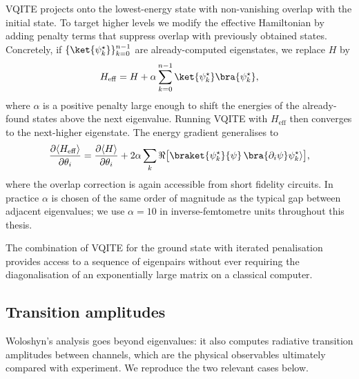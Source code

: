 VQITE projects onto the lowest-energy state with non-vanishing overlap
with the initial state. To target higher levels we modify the effective
Hamiltonian by adding penalty terms that suppress overlap with previously
obtained states. Concretely, if $\{\ket{\psi_k^{\star}}\}_{k=0}^{n-1}$
are already-computed eigenstates, we replace $H$ by
\begin{equation}
  \label{eq:penalised_H}
  H_{\mathrm{eff}}
  = H + \alpha\sum_{k=0}^{n-1} \ket{\psi_k^{\star}}\bra{\psi_k^{\star}},
\end{equation}
where $\alpha$ is a positive penalty large enough to shift the energies
of the already-found states above the next eigenvalue. Running VQITE
with $H_{\mathrm{eff}}$ then converges to the next-higher eigenstate.
The energy gradient generalises to
\begin{equation}
  \label{eq:penalised_grad}
  \frac{\partial \langle H_{\mathrm{eff}}\rangle}{\partial\theta_i}
  = \frac{\partial \langle H\rangle}{\partial\theta_i}
  + 2\alpha\sum_{k}\Re\bigl[\braket{\psi_k^{\star}}{\psi}\,
                            \bra{\partial_i\psi}\psi_k^{\star}\rangle\bigr],
\end{equation}
where the overlap correction is again accessible from short fidelity
circuits. In practice $\alpha$ is chosen of the same order of magnitude
as the typical gap between adjacent eigenvalues; we use $\alpha = 10$ in
inverse-femtometre units throughout this thesis.

The combination of VQITE for the ground state with iterated penalisation
provides access to a sequence of eigenpairs without ever requiring the
diagonalisation of an exponentially large matrix on a classical computer.

\subsection{Transition amplitudes}
\label{ssec:transitions}

Woloshyn's analysis goes beyond eigenvalues: it also computes radiative
transition amplitudes between channels, which are the physical
observables ultimately compared with experiment. We reproduce the two
relevant cases below.

